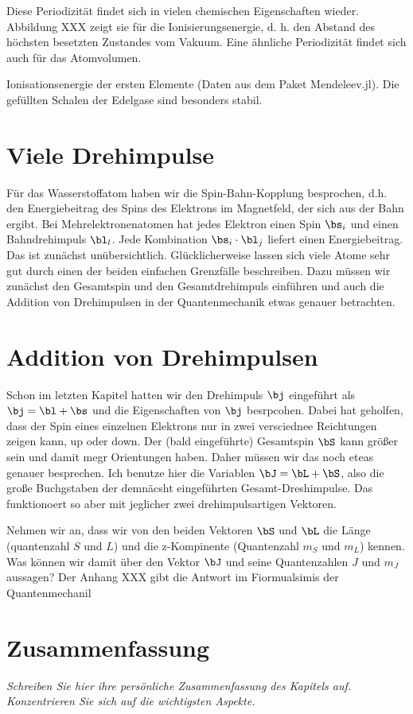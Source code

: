 Diese Periodizität findet sich in vielen chemischen Eigenschaften wieder. Abbildung XXX zeigt sie für die Ionisierungsenergie, d. h. den Abstand des höchsten besetzten Zustandes vom Vakuum. Eine ähnliche Periodizität findet sich auch für das Atomvolumen.

\begin{marginfigure}
    \caption{Ionisationsenergie der ersten Elemente (Daten aus dem Paket Mendeleev.jl). Die gefüllten Schalen der Edelgase sind besonders stabil.}
\end{marginfigure}


\section{Viele Drehimpulse}


Für das Wasserstoffatom haben wir die Spin-Bahn-Kopplung besprochen, d.h. den Energiebeitrag des Spins des Elektrons im Magnetfeld, der sich aus der Bahn ergibt. Bei Mehrelektronenatomen hat jedes Elektron einen Spin $\bs_i$ und einen Bahndrehimpuls $\bl_l$. Jede Kombination $\bs_i \cdot \bl_j$ liefert einen Energiebeitrag. Das ist zunächst unübersichtlich. Glücklicherweise lassen sich viele Atome sehr gut durch einen der beiden einfachen Grenzfälle beschreiben. Dazu müssen wir zunächst den Gesamtspin und den Gesamtdrehimpuls einführen und auch die Addition von Drehimpulsen in der Quantenmechanik etwas genauer betrachten.


\section{Addition von Drehimpulsen}

Schon im letzten Kapitel hatten wir den Drehimpuls $\bj$ eingeführt als $\bj = \bl + \bs$ und die Eigenschaften von $\bj$ besrpcohen. Dabei hat geholfen, dass der Spin eines einzelnen Elektrons nur in zwei versciednee Reichtungen zeigen kann, up oder down. Der (bald eingeführte) Gesamtspin $\bS$ kann größer sein und damit megr Orientungen haben. Daher müssen wir das noch eteas genauer besprechen. Ich benutze hier die Variablen $\bJ = \bL + \bS$, also die große Buchgstaben der demnäcsht eingeführten Gesamt-Dreshimpulse. Das funktionoert so aber mit jeglicher zwei drehimpulsartigen Vektoren.

Nehmen wir an, dass wir von den beiden Vektoren $\bS$ und $\bL$ die Länge (quantenzahl $S$ und $L$) und die z-Kompinente (Quantenzahl $m_S$ und $m_L$) kennen. Was können wir damit über den Vektor $\bJ$ und seine Quantenzahlen $J$ und $m_J$ aussagen? Der Anhang XXX gibt die Antwort im Fiormualsimis der Quantenmechanil



\section{Zusammenfassung}

\textit{Schreiben Sie hier ihre persönliche Zusammenfassung des Kapitels auf. Konzentrieren Sie sich auf die wichtigsten Aspekte.}

\vspace*{10cm}


\printbibliography[segment=\therefsegment,heading=subbibliography]
